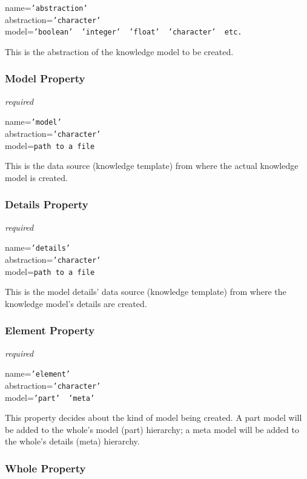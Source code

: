 name=\texttt{'abstraction'}\\
abstraction=\texttt{'character'}\\
model=\texttt{'boolean' \vline\ 'integer' \vline\ 'float' \vline\ 'character' \vline\ etc.}

This is the abstraction of the knowledge model to be created.

\subsubsection{Model Property}

\emph{required}

name=\texttt{'model'}\\
abstraction=\texttt{'character'}\\
model=\texttt{path to a file}

This is the data source (knowledge template) from where the actual knowledge
model is created.

\subsubsection{Details Property}

\emph{required}

name=\texttt{'details'}\\
abstraction=\texttt{'character'}\\
model=\texttt{path to a file}

This is the model details' data source (knowledge template) from where the
knowledge model's details are created.

\subsubsection{Element Property}

\emph{required}

name=\texttt{'element'}\\
abstraction=\texttt{'character'}\\
model=\texttt{'part' \vline\ 'meta'}

This property decides about the kind of model being created. A part model will
be added to the whole's model (part) hierarchy; a meta model will be added to the
whole's details (meta) hierarchy.

\subsubsection{Whole Property}

